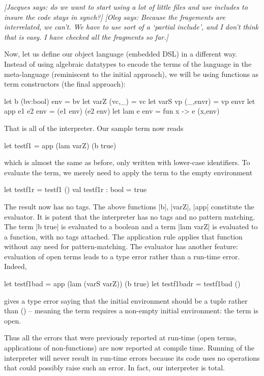 \documentclass[preprint]{sigplanconf}
\newcommand{\jacques}[1]{{\it [Jacques says: #1]}}
\newcommand{\oleg}[1]{{\it [Oleg says: #1]}}
\begin{document}
\jacques{do we want to start using a lot of little files and
use includes to insure the code stays in synch?}
\oleg{Because the fragements are interrelated, we can't. We have to
  use sort of a `partial include', and I don't think that is easy. I
  have checked all the fragments so far.}

Now, let us define our object language (embedded DSL) in a different
way. Instead of using algebraic datatypes to encode the terms of the
language in the meta-language (reminiscent to the initial approach),
we will be using functions as term constructors (the final approach):

\begin{code}
  let b (bv:bool) env = bv
  let varZ (vc,_) = vc
  let varS vp (_,envr) = vp envr
  let app e1 e2 env = (e1 env) (e2 env)
  let lam e env = fun x -> e (x,env)
\end{code}

That is all of the interpreter. Our sample term now reads
\begin{code}
  let testf1 = app (lam varZ) (b true)
\end{code}
which is almost the same as before, only written with lower-case
identifiers. To evaluate the term, we merely need to apply 
the term to the empty environment

\begin{code}
  let testf1r = testf1 ()
  val testf1r : bool = true
\end{code}

The result now has no tags. The above functions |b|,
|varZ|, |app| constitute the evaluator. It is patent that the
interpreter has no tags and no pattern matching. The term |b true| is
evaluated to a boolean and a term |lam varZ| is evaluated to a
function, with no tags attached. The application rule applies that
function without any need for pattern-matching. The evaluator has
another feature: evaluation of open terms leads to a type error rather
than a run-time error. Indeed, 

\begin{code}
  let testf1bad = app (lam (varS varZ)) (b true)
  let testf1badr = testf1bad ()
\end{code}
gives a type error saying 
that the initial environment should be a tuple rather than () --
meaning the term requires a non-empty initial environment: the term is
open.

Thus all the errors that were previously reported at run-time (open terms,
applications of non-functions) are now reported at compile
time. Running of the interpreter will never result in run-time errors
because its code uses no operations that could possibly raise such
an error. In fact, our interpreter is total.
\end{document}
